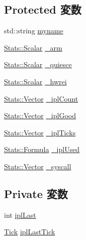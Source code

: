 \subsection*{Protected 変数}
\begin{DoxyCompactItemize}
\item 
std::string \hyperlink{classKernel_1_1Statistics_a82f8b285df43a96ef98c9860d59d26c4}{myname}
\item 
\hyperlink{classStats_1_1Scalar}{Stats::Scalar} \hyperlink{classKernel_1_1Statistics_af30d0cfbeeb3d86c5eaf2556eb34d998}{\_\-arm}
\item 
\hyperlink{classStats_1_1Scalar}{Stats::Scalar} \hyperlink{classKernel_1_1Statistics_a30eed2777985031390e86ff0e467516a}{\_\-quiesce}
\item 
\hyperlink{classStats_1_1Scalar}{Stats::Scalar} \hyperlink{classKernel_1_1Statistics_a14c763378a8575ec77948744bc0f074b}{\_\-hwrei}
\item 
\hyperlink{classStats_1_1Vector}{Stats::Vector} \hyperlink{classKernel_1_1Statistics_ab7b15cc0b0fd649346f6098d965a4d9f}{\_\-iplCount}
\item 
\hyperlink{classStats_1_1Vector}{Stats::Vector} \hyperlink{classKernel_1_1Statistics_a2984139cc7ec1346f9e75a0f61ca46f1}{\_\-iplGood}
\item 
\hyperlink{classStats_1_1Vector}{Stats::Vector} \hyperlink{classKernel_1_1Statistics_ab4025781ad01d9ceffed1af8fccc7782}{\_\-iplTicks}
\item 
\hyperlink{classStats_1_1Formula}{Stats::Formula} \hyperlink{classKernel_1_1Statistics_afffb46a8abc2ee13b73b1979b703b801}{\_\-iplUsed}
\item 
\hyperlink{classStats_1_1Vector}{Stats::Vector} \hyperlink{classKernel_1_1Statistics_a7677e0279f2b7fe2268ef8803d18f5bb}{\_\-syscall}
\end{DoxyCompactItemize}
\subsection*{Private 変数}
\begin{DoxyCompactItemize}
\item 
int \hyperlink{classKernel_1_1Statistics_a68a44a29c95e4c51a26809ed832dd500}{iplLast}
\item 
\hyperlink{base_2types_8hh_a5c8ed81b7d238c9083e1037ba6d61643}{Tick} \hyperlink{classKernel_1_1Statistics_a29e66bc82eeb467c26bbd6958df2eb98}{iplLastTick}
\end{DoxyCompactItemize}


